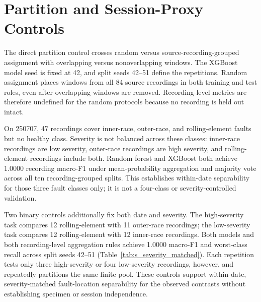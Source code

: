 \documentclass[11pt]{article}
\begin{document}
\section{Partition and Session-Proxy Controls}
The direct partition control crosses random versus source-recording-grouped assignment with overlapping versus nonoverlapping windows. The XGBoost model seed is fixed at 42, and split seeds 42--51 define the repetitions. Random assignment places windows from all 84 source recordings in both training and test roles, even after overlapping windows are removed. Recording-level metrics are therefore undefined for the random protocols because no recording is held out intact.

\begin{table}[H]
\centering
\caption{Direct partition comparison across ten parallel split seeds. Variability is split variability, not optimization-seed variability.}
\label{tab:s_partition_control}
\small
{}
\end{table}

On 250707, 47 recordings cover inner-race, outer-race, and rolling-element faults but no healthy class. Severity is not balanced across these classes: inner-race recordings are low severity, outer-race recordings are high severity, and rolling-element recordings include both. Random forest and XGBoost both achieve 1.0000 recording macro-F1 under mean-probability aggregation and majority vote across all ten recording-grouped splits. This establishes within-date separability for those three fault classes only; it is not a four-class or severity-controlled validation.

Two binary controls additionally fix both date and severity. The high-severity task compares 12 rolling-element with 11 outer-race recordings; the low-severity task compares 12 rolling-element with 12 inner-race recordings. Both models and both recording-level aggregation rules achieve 1.0000 macro-F1 and worst-class recall across split seeds 42--51 (Table~\ref{tab:s_severity_matched}). Each repetition tests only three high-severity or four low-severity recordings, however, and repeatedly partitions the same finite pool. These controls support within-date, severity-matched fault-location separability for the observed contrasts without establishing specimen or session independence.
\end{document}
